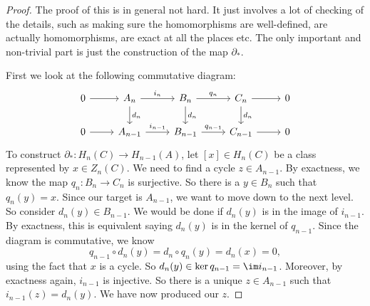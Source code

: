 \documentclass[a4paper]{article}
\begin{document}
\begin{proof}
  The proof of this is in general not hard. It just involves a lot of checking of the details, such as making sure the homomorphisms are well-defined, are actually homomorphisms, are exact at all the places etc. The only important and non-trivial part is just the construction of the map $\partial_*$.

  First we look at the following commutative diagram:
  \[
    \begin{tikzcd}
      0 \ar[r] & A_n \ar[r, "i_n"] \ar[d, "d_n"] & B_n \ar[r, "q_n"] \ar[d, "d_n"] & C_n \ar[r] \ar[d, "d_n"] & 0\\
      0 \ar[r] & A_{n - 1} \ar[r, "i_{n - 1}"] & B_{n - 1} \ar[r, "q_{n - 1}"] & C_{n - 1} \ar[r] & 0
    \end{tikzcd}
  \]
  To construct $\partial_*: H_n(C) \to H_{n - 1}(A)$, let $[x] \in H_n(C)$ be a class represented by $x \in Z_n(C)$. We need to find a cycle $z \in A_{n - 1}$. By exactness, we know the map $q_n: B_n \to C_n$ is surjective. So there is a $y \in B_n$ such that $q_n(y) = x$. Since our target is $A_{n - 1}$, we want to move down to the next level. So consider $d_n(y) \in B_{n - 1}$. We would be done if $d_n(y)$ is in the image of $i_{n - 1}$. By exactness, this is equivalent saying $d_n(y)$ is in the kernel of $q_{n -1 }$. Since the diagram is commutative, we know
  \[
    q_{n - 1}\circ d_n(y) = d_n \circ q_n (y) = d_n(x) = 0,
  \]
  using the fact that $x$ is a cycle. So $d_n (y) \in \ker q_{n - 1} = \im i_{n - 1}$. Moreover, by exactness again, $i_{n - 1}$ is injective. So there is a unique $z \in A_{n - 1}$ such that $i_{n - 1}(z) = d_n(y)$. We have now produced our $z$.


\end{proof}
\end{document}
